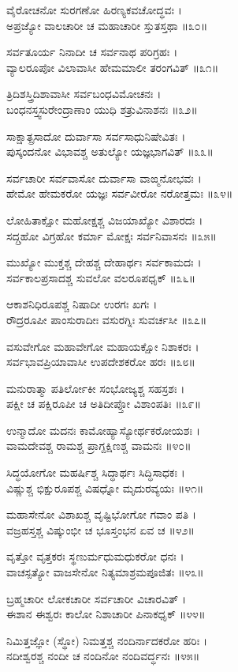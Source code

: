 ವೈರೋಚನೋ ಸುರಗಣೋ ಹಿರಣ್ಯಕವಚೋದ್ಧವಃ ।\\
ಅಪ್ರಜ್ಯೋ ವಾಲಚಾರೀ ಚ ಮಹಾಚಾರೀ ಸ್ತುತಸ್ತಥಾ ॥೩೦॥

ಸರ್ವತೂರ್ಯ ನಿನಾದೀ ಚ ಸರ್ವನಾಥ ಪರಿಗ್ರಹಃ ।\\
ವ್ಯಾಲರೂಪೋ ವಿಲಾವಾಸೀ ಹೇಮಮಾಲೀ ತರಂಗವಿತ್ ॥೩೧॥

ತ್ರಿದಿಶಸ್ತ್ರಿದಿಶಾವಾಸೀ ಸರ್ವಬಂಧವಿಮೋಚನಃ ।\\
ಬಂಧನಸ್ತ್ವಸುರೇಂದ್ರಾಣಾಂ ಯುಧಿ ಶತ್ರುವಿನಾಶನಃ ॥೩೨॥

ಸಾಕ್ಷಾತ್ಪ್ರಸಾದೋ ದುರ್ವಾಸಾ ಸರ್ವಸಾಧುನಿಷೇವಿತಃ ।\\
ಪುಸ್ಕಂದನೋ ವಿಭಾವಶ್ಚ ಅತುಲ್ಯೋ ಯಜ್ಞಭಾಗವಿತ್ ॥೩೩॥

ಸರ್ವಚಾರೀ ಸರ್ವವಾಸೋ ದುರ್ವಾಸಾ ವಾಙ್ಮನೋಭವಃ ।\\
ಹೇಮೋ ಹೇಮಕರೋ ಯಜ್ಞಃ ಸರ್ವವೀರೋ ನರೋತ್ತಮಃ ॥೩೪॥

ಲೋಹಿತಾಕ್ಷೋ ಮಹೋಕ್ಷಶ್ಚ ವಿಜಯಾಖ್ಯೋ ವಿಶಾರದಃ ।\\
ಸದ್ಗ್ರಹೋ ವಿಗ್ರಹೋ ಕರ್ಮಾ ಮೋಕ್ಷಃ ಸರ್ವನಿವಾಸನಃ ॥೩೫॥

ಮುಖ್ಯೋ ಮುಕ್ತಶ್ಚ ದೇಹಶ್ಚ ದೇಹಾರ್ಥಃ ಸರ್ವಕಾಮದಃ ।\\
ಸರ್ವಕಾಲಪ್ರಸಾದಶ್ಚ ಸುವಲೋ ವಲರೂಪಧೃಕ್ ॥೩೬॥

ಆಕಾಶನಿಧಿರೂಪಶ್ಚ ನಿಷಾದೀ ಉರಗಃ ಖಗಃ ।\\
ರೌದ್ರರೂಪೀ ಪಾಂಸುರಾದೀಃ ವಸುರಗ್ನಿಃ ಸುವರ್ಚಸೀ ॥೩೭॥

ವಸುವೇಗೋ ಮಹಾವೇಗೋ ಮಹಾಯಕ್ಷೋ ನಿಶಾಕರಃ ।\\
ಸರ್ವಭಾವಪ್ರಿಯಾವಾಸೀ ಉಪದೇಶಕರೋ ಹರಃ ॥೩೮॥

ಮನುರಾತ್ಮಾ ಪತಿರ್ಲೋಕೀ ಸಂಭೋಜ್ಯಶ್ಚ ಸಹಸ್ರಶಃ ।\\
ಪಕ್ಷೀ ಚ ಪಕ್ಷಿರೂಪೀ ಚ ಅತಿದೀಪ್ತೋ ವಿಶಾಂಪತಿಃ ॥೩೯॥

ಉನ್ಮಾದೋ ಮದನಃ ಕಾಮೋಹ್ಯಾಸ್ಯೋರ್ಥಕರೋಯಶಃ ।\\
ವಾಮದೇವಶ್ಚ ರಾಮಶ್ಚ ಪ್ರಾಗ್ದಕ್ಷಿಣಶ್ಚ ವಾಮನಃ ॥೪೦॥

ಸಿದ್ಧಯೋಗೋ ಮಹರ್ಷಿಶ್ಚ ಸಿದ್ಧಾರ್ಥಃ ಸಿದ್ಧಿಸಾಧಕಃ ।\\
ವಿಷ್ಣುಶ್ಚ ಭಿಕ್ಷುರೂಪಶ್ಚ ವಿಷಧ್ನೋ ಮೃದುರವ್ಯಯಃ ॥೪೧॥

ಮಹಾಸೇನೋ ವಿಶಾಖಶ್ಚ ವೃಷ್ಟಿಭೋಗೋ ಗವಾಂ ಪತಿ ।\\
ವಜ್ರಹಸ್ತಶ್ಚ ವಿಷ್ಕುಂಭೀ ಚ ಭೂಸ್ತಂಭನ ಏವ ಚ ॥೪೨॥

ವೃತ್ತೋ ವೃತ್ತಕರಃ ಸ್ಥಣುರ್ಮಧುಮಧುಕರೋ ಧನಃ ।\\
ವಾಚಸ್ಪತ್ಯೋ ವಾಜಸೇನೋ ನಿತ್ಯಮಾಶ್ರಮಪೂಜಿತಃ ॥೪೩॥

ಬ್ರಹ್ಮಚಾರೀ ಲೋಕಚಾರೀ ಸರ್ವಚಾರೀ ವಿಚಾರವಿತ್ ।\\
ಈಶಾನ ಈಶ್ವರಃ ಕಾಲೋ ನಿಶಾಚಾರೀ ಪಿನಾಕಧೃಕ್ ॥೪೪॥

ನಿಮಿತ್ತಜ್ಞೋ (ಸ್ಥೋ) ನಿಮತ್ತಶ್ಚ ನಂದಿರ್ನಾದಕರೋ ಹರಿಃ ।\\
ನದೀಶ್ವರಶ್ಚ ನಂದೀ ಚ ನಂದಿನೋ ನಂದಿವರ್ದ್ಧನಃ ॥೪೫॥

